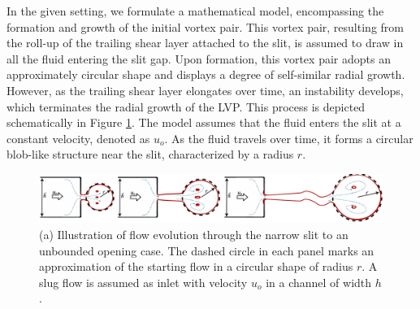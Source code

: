 \documentclass[final,3p,10pt,times,review,authoryear]{elsarticle}
\begin{document}
	In the given setting, we formulate a mathematical model, encompassing the formation and growth of the initial vortex pair. This vortex pair, resulting from the roll-up of the trailing shear layer attached to the slit, is assumed to draw in all the fluid entering the slit gap. Upon formation, this vortex pair adopts an approximately circular shape and displays a degree of self-similar radial growth. However, as the trailing shear layer elongates over time, an instability develops, which terminates the radial growth of the LVP. This process is depicted schematically in Figure \ref{fig:model}. The model assumes that the fluid enters the slit at a constant velocity, denoted as $u_o$. As the fluid travels over time, it forms a circular blob-like structure near the slit, characterized by a radius $r$.
		\begin{figure}
		\centering
		\begin{minipage}[c]{1\linewidth}	
			\includegraphics[width=1\linewidth]{Figures/VortexPair/model_100_200_400_3.png}
		\end{minipage}
		
		\caption{(a) Illustration of flow evolution through the narrow slit to an unbounded opening case. The dashed circle in each panel marks an approximation of the starting flow in a circular shape of radius $r$. A slug flow is assumed as inlet with velocity $u_o$ in a channel of width $h$.}
		\label{fig:model}
	\end{figure}
\end{document}
